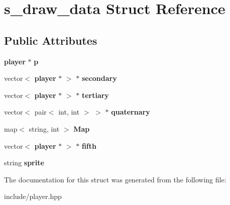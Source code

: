 \section{s\+\_\+draw\+\_\+data Struct Reference}
\label{structs__draw__data}
\subsection*{Public Attributes}
\begin{DoxyCompactItemize}
\item 
\mbox{\label{structs__draw__data_a3800961e5f73ac08f8cc85bc9ac63877}} 
\textbf{ player} $\ast$ {\bfseries p}
\item 
\mbox{\label{structs__draw__data_acf538c8d6ad30424795acb326ca52d8e}} 
vector$<$ \textbf{ player} $\ast$ $>$ $\ast$ {\bfseries secondary}
\item 
\mbox{\label{structs__draw__data_a3db1990ea223075020306acbd83d0e58}} 
vector$<$ \textbf{ player} $\ast$ $>$ $\ast$ {\bfseries tertiary}
\item 
\mbox{\label{structs__draw__data_aa73d7ce059f266a170139e95302b1356}} 
vector$<$ pair$<$ int, int $>$ $>$ $\ast$ {\bfseries quaternary}
\item 
\mbox{\label{structs__draw__data_a499216d35b2c5b5329b7dfa9a66d69ec}} 
map$<$ string, int $>$ {\bfseries Map}
\item 
\mbox{\label{structs__draw__data_a2c856a6ad18d8973e7756b05b18a0e75}} 
vector$<$ \textbf{ player} $\ast$ $>$ $\ast$ {\bfseries fifth}
\item 
\mbox{\label{structs__draw__data_a410c5a6660eb4b7c3a03684b6cfd564f}} 
string {\bfseries sprite}
\end{DoxyCompactItemize}


The documentation for this struct was generated from the following file\+:\begin{DoxyCompactItemize}
\item 
include/player.\+hpp\end{DoxyCompactItemize}
